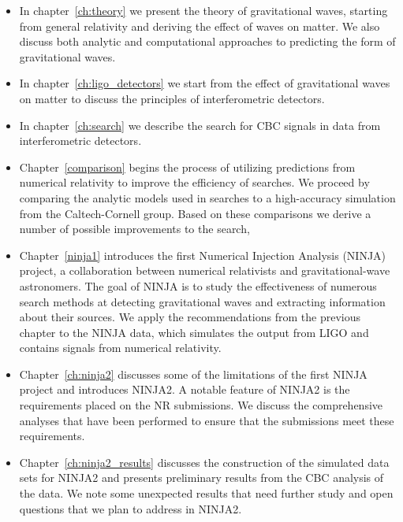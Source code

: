 \begin{itemize}

\item In chapter~\ref{ch:theory} we present the theory of
gravitational waves, starting from general relativity and deriving
the effect of waves on matter.  We also discuss both analytic and
computational approaches to predicting the form of gravitational
waves.

\item In chapter~\ref{ch:ligo_detectors} we start from the effect of
gravitational waves on matter to discuss the principles of
interferometric detectors. 

\item In chapter~\ref{ch:search} we describe the search for CBC
signals in data from interferometric detectors.

\item Chapter~\ref{comparison} begins the process of utilizing
predictions from numerical relativity to improve the efficiency of
searches.  We proceed by comparing the analytic models used in
searches to a high-accuracy simulation from the Caltech-Cornell group.
Based on these comparisons we derive a number of possible improvements
to the search,

\item Chapter~\ref{ninja1} introduces the first Numerical Injection
Analysis (NINJA) project, a collaboration between numerical
relativists and gravitational-wave astronomers.  The goal of NINJA is
to study the effectiveness of numerous search methods at detecting
gravitational waves and extracting information about their sources.
We apply the recommendations from the previous chapter to the NINJA
data, which simulates the output from LIGO and contains signals from
numerical relativity.

\item Chapter~\ref{ch:ninja2} discusses some of the limitations of the
first NINJA project and introduces NINJA2.  A notable feature of
NINJA2 is the requirements placed on the NR submissions.  We discuss 
the comprehensive analyses that have been performed to ensure that the
submissions meet these requirements.

\item Chapter~\ref{ch:ninja2_results} discusses the construction of the
simulated data sets for NINJA2 and presents preliminary results from
the CBC analysis of the data.  We note some unexpected results that
need further study and open questions that we plan to address in
NINJA2.


\end{itemize}

